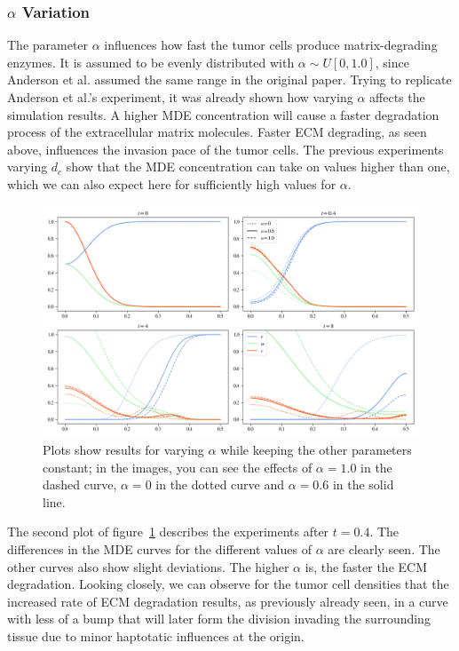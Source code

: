 \subsubsection*{$\alpha$ Variation}
The parameter $\alpha$ influences how fast the tumor cells produce matrix-degrading enzymes. It is assumed to be evenly distributed with $\alpha \sim U[0, 1.0]$, since Anderson et al. assumed the same range in the original paper. Trying to replicate Anderson et al.'s experiment, it was already shown how varying $\alpha$ affects the simulation results. A higher MDE concentration will cause a faster degradation process of the extracellular matrix molecules. Faster ECM degrading, as seen above, influences the invasion pace of the tumor cells. The previous experiments varying $d_c$ show that the MDE concentration can take on values higher than one, which we can also expect here for sufficiently high values for $\alpha$. 
\begin{figure}[h]
 \centering
 \includegraphics[width=\textwidth]{resources/images/alpha_variation.png}
 \caption{Plots show results for varying $\alpha$ while keeping the other parameters constant; in the images, you can see the effects of $\alpha=1.0$ in the dashed curve, $\alpha=0$ in the dotted curve and $\alpha=0.6$ in the solid line.}
 \label{fig:alpha_variation}
\end{figure}

The second plot of figure~\ref{fig:alpha_variation} describes the experiments after $t=0.4$. The differences in the MDE curves for the different values of $\alpha$ are clearly seen. The other curves also show slight deviations. The higher $\alpha$ is, the faster the ECM degradation. Looking closely, we can observe for the tumor cell densities that the increased rate of ECM degradation results, as previously already seen, in a curve with less of a bump that will later form the division invading the surrounding tissue due to minor haptotatic influences at the origin.

